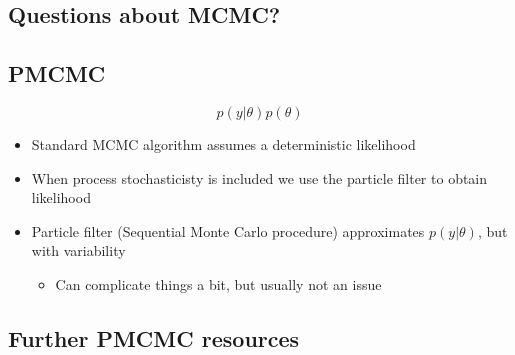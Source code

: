 \documentclass[
  letterpaper,
  DIV=11,
  numbers=noendperiod]{scrartcl}
\providecommand{\tightlist}{%
  \setlength{\itemsep}{0pt}\setlength{\parskip}{0pt}}\usepackage{longtable,booktabs,array}
\begin{document}
\hypertarget{questions-about-mcmc}{%
\subsection{Questions about MCMC?}\label{questions-about-mcmc}}

\hypertarget{pmcmc}{%
\subsection{PMCMC}\label{pmcmc}}

\Huge

\[p(y|\theta)p(\theta)\]

\large

\begin{itemize}
\tightlist
\item
  Standard MCMC algorithm assumes a deterministic likelihood
\item
  When process stochasticisty is included we use the particle filter to
  obtain likelihood
\item
  Particle filter (Sequential Monte Carlo procedure) approximates
  \(p(y|\theta)\), but with variability

  \begin{itemize}
  \tightlist
  \item
    Can complicate things a bit, but usually not an issue
  \end{itemize}
\end{itemize}

\hypertarget{further-pmcmc-resources}{%
\subsection{Further PMCMC resources}\label{further-pmcmc-resources}}

\large
\end{document}
